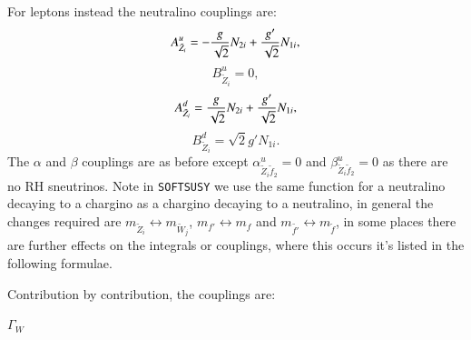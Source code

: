 \documentclass[final,3p,times]{elsarticle}
\begin{document}
For leptons instead the neutralino couplings are:
\begin{equation}
A_{\tilde{Z}_i}^{u} = -{g \over \sqrt{2}}N_{2i} + {g' \over \sqrt{2}}N_{1i},
\end{equation}
\begin{equation}
B_{\tilde{Z}_i}^{u} = 0,
\end{equation}
\begin{equation}
A_{\tilde{Z}_{i}}^{d} = {g \over \sqrt{2}}N_{2i} + {g' \over \sqrt{2}}N_{1i},
\end{equation}
\begin{equation}
B_{\tilde{Z}_{i}}^{d} = \sqrt{2} g' N_{1i}.
\end{equation}
The $\alpha$ and $\beta$ couplings are as before except $\alpha_{\tilde{Z}_{i} \tilde{f}_2}^{u} = 0$ and $\beta_{\tilde{Z}_{i} \tilde{f}_2}^{u} = 0$ as there are no RH sneutrinos.
Note in {\tt {\tt SOFTSUSY}} we use the same function for a neutralino decaying to a chargino as a chargino decaying to a neutralino, in general the changes required are $m_{\tilde{Z}_i} \leftrightarrow m_{\tilde{W}_j}$, $m_{f'} \leftrightarrow m_{f}$ and $m_{\tilde{f'}} \leftrightarrow m_{\tilde{f}}$, in some places there are further effects on the integrals or couplings, where this occurs it's listed in the following formulae.

Contribution by contribution, the couplings are:

\textbf{\underline{$\Gamma_{W}$}}
\end{document}
